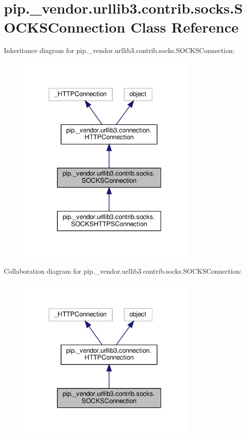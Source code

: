 \hypertarget{classpip_1_1__vendor_1_1urllib3_1_1contrib_1_1socks_1_1SOCKSConnection}{}\section{pip.\+\_\+vendor.\+urllib3.\+contrib.\+socks.\+S\+O\+C\+K\+S\+Connection Class Reference}
\label{classpip_1_1__vendor_1_1urllib3_1_1contrib_1_1socks_1_1SOCKSConnection}


Inheritance diagram for pip.\+\_\+vendor.\+urllib3.\+contrib.\+socks.\+S\+O\+C\+K\+S\+Connection\+:
\nopagebreak
\begin{figure}[H]
\begin{center}
\leavevmode
\includegraphics[width=253pt]{classpip_1_1__vendor_1_1urllib3_1_1contrib_1_1socks_1_1SOCKSConnection__inherit__graph}
\end{center}
\end{figure}


Collaboration diagram for pip.\+\_\+vendor.\+urllib3.\+contrib.\+socks.\+S\+O\+C\+K\+S\+Connection\+:
\nopagebreak
\begin{figure}[H]
\begin{center}
\leavevmode
\includegraphics[width=253pt]{classpip_1_1__vendor_1_1urllib3_1_1contrib_1_1socks_1_1SOCKSConnection__coll__graph}
\end{center}
\end{figure}

